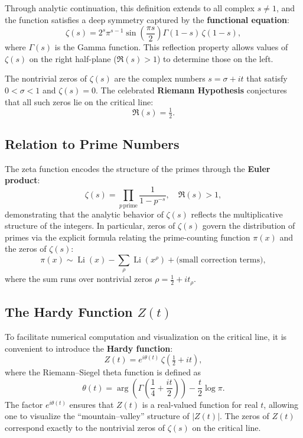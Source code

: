 \documentclass[11pt,a4paper]{article}
\begin{document}
Through analytic continuation, this definition extends to all complex \( s \neq 1 \), and the function satisfies a deep symmetry captured by the \textbf{functional equation}:
\[
\zeta(s) = 2^s \pi^{s-1} \sin\!\left(\frac{\pi s}{2}\right)
\Gamma(1-s)\, \zeta(1-s),
\]
where \( \Gamma(s) \) is the Gamma function.  
This reflection property allows values of \( \zeta(s) \) on the right half-plane (\( \Re(s) > 1 \)) to determine those on the left.

The nontrivial zeros of \( \zeta(s) \) are the complex numbers \( s = \sigma + it \) that satisfy \( 0 < \sigma < 1 \) and \( \zeta(s) = 0 \).  
The celebrated \textbf{Riemann Hypothesis} conjectures that all such zeros lie on the critical line:
\[
\Re(s) = \tfrac{1}{2}.
\]

\subsection{Relation to Prime Numbers}

The zeta function encodes the structure of the primes through the \textbf{Euler product}:
\[
\zeta(s) = \prod_{p\,\text{prime}} \frac{1}{1 - p^{-s}}, \quad \Re(s) > 1,
\]
demonstrating that the analytic behavior of \( \zeta(s) \) reflects the multiplicative structure of the integers.  
In particular, zeros of \( \zeta(s) \) govern the distribution of primes via the explicit formula relating the prime-counting function \(\pi(x)\) and the zeros of \( \zeta(s) \):
\[
\pi(x) \sim \operatorname{Li}(x) - \sum_{\rho} \operatorname{Li}(x^{\rho}) + \text{(small correction terms)},
\]
where the sum runs over nontrivial zeros \( \rho = \tfrac{1}{2} + i t_\rho \).

\subsection{The Hardy Function \(Z(t)\)}

To facilitate numerical computation and visualization on the critical line, it is convenient to introduce the \textbf{Hardy function}:
\[
Z(t) = e^{i\theta(t)}\,\zeta\!\left(\tfrac{1}{2} + it\right),
\]
where the Riemann–Siegel theta function is defined as
\[
\theta(t) = \arg\!\left(\Gamma\!\left(\frac{1}{4} + \frac{it}{2}\right)\right) - \frac{t}{2}\log\pi.
\]
The factor \( e^{i\theta(t)} \) ensures that \( Z(t) \) is a real-valued function for real \( t \), allowing one to visualize the “mountain–valley” structure of \(|Z(t)|\).  
The zeros of \( Z(t) \) correspond exactly to the nontrivial zeros of \(\zeta(s)\) on the critical line.
\end{document}
